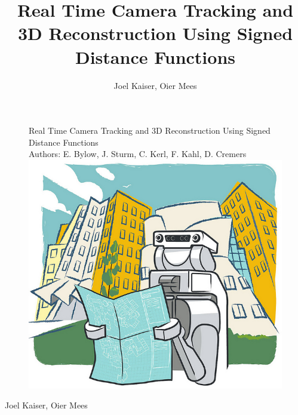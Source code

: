 \documentclass{beamer}
\begin{document}
\setcounter{section}{0}

\title[Real Time Camera Tracking and 3D Reconstruction
Using SDF]{Real Time Camera Tracking and 3D Reconstruction
Using Signed Distance Functions}
\author{Joel Kaiser, Oier Mees}
\begin{frame}
 \begin{center}
\begin{figure}[h]
\centering
\LARGE{Real Time Camera Tracking and 3D Reconstruction
Using Signed Distance Functions}\\
\large{Authors: E. Bylow, J. Sturm, C. Kerl, F. Kahl, D. Cremers}\\
\includegraphics{titleImg.jpg}
\end{figure}
\large{Joel Kaiser, Oier Mees}
\end{center}
\end{frame}
\end{document}
